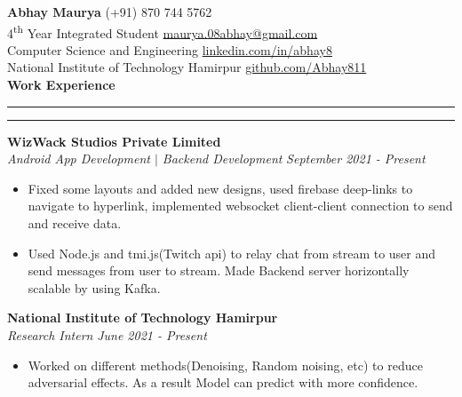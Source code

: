\documentclass[11pt]{article}
\author{Abhay Maurya}
\begin{document}
	\LARGE{\textbf{Abhay Maurya}}
	\small
	\hfill
        (+91) 870 744 5762 \\
    4\textsuperscript{th} Year Integrated Student
    \hfill
        \href{mailto:maurya.08abhay@gmail.com}{\color{blue}maurya.08abhay@gmail.com}\\
    \hfill
        Computer Science and Engineering
    \hfill
        \href{https://www.linkedin.com/in/abhay8/}{\color{blue}linkedin.com/in/abhay8}\\
    \hfill
    National Institute of Technology Hamirpur
    \hfill
     	\href{https://github.com/Abhay811}{\color{blue}github.com/Abhay811}\\
    
    \vspace{4pt}
    \textbf{\large{Work Experience}}
    	\vspace{5pt}
    	\hrule \hrule
    	\vspace{4pt}
    	\textbf{WizWack Studios Private Limited}
    	\href{https://drive.google.com/file/d/1GKUMLnI26wRim3qdr-GsE-1DidYjr17D/view?usp=sharing}{\color{blue}}
    	\hfill
    	\\
    	\textit{Android App Development $|$ Backend Development}
    	\hfill
    	\textit{September 2021 - Present}
    	\vspace{-6pt}
    	\begin{itemize}
    		\setlength{\itemsep}{0pt}
        	\setlength{\parskip}{0pt}
        	\setlength{\parsep}{0pt}
    		\item Fixed some layouts and added new designs, used firebase deep-links to navigate to hyperlink, implemented websocket client-client connection to send and receive data.
    		\item Used Node.js and tmi.js(Twitch api) to relay chat from stream to user and send messages from user to stream. Made Backend server horizontally scalable by using Kafka. 
    	\end{itemize}
    	\textbf{National Institute of Technology Hamirpur}
    	\hfill
    	\\
    	\textit{Research Intern}
    	\hfill
    	\textit{June 2021 - Present}
    	\vspace{-6pt}
    	\begin{itemize}
    		\setlength{\itemsep}{0pt}
    		\setlength{\parskip}{0pt}
    		\setlength{\parsep}{0pt}
    		\item Worked on different methods(Denoising, Random noising, etc) to reduce adversarial effects. As a result Model can predict with more confidence.
    	\end{itemize}
\end{document}
